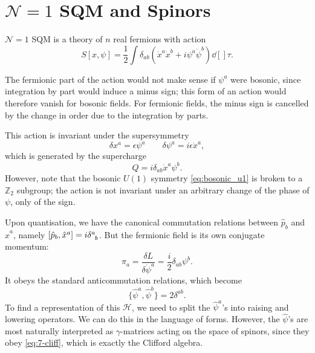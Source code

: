 \section{\texorpdfstring{$\mathcal{N} = 1$}{One-dimensional} SQM and Spinors }%
\label{sec:$n = 1$_one_dimensional_sqm_and_spinors_}

$\mathcal{N} = 1$ SQM is a theory of $n$ real fermions with action
\begin{equation}
  S[x, \psi] = \frac{1}{2} \int \delta_{ab} \left( \dot{x}^{a} \dot{x}^{b} + i \psi^{a} \dot{\psi}^{b} \right) \dd[]{\tau}.
\end{equation}
\begin{remark}
  The fermionic part of the action would not make sense if $\psi^{a}$ were bosonic, since integration by part would induce a minus sign; this form of an action would therefore vanish for bosonic fields.
  For fermionic fields, the minus sign is cancelled by the change in order due to the integration by parts.
\end{remark}
This action is invariant under the supersymmetry
\begin{equation}
  \label{eq:n1susy}
  \delta x^{a} = \epsilon \psi^{a} \qquad \delta\psi^{a} = i \epsilon \dot{x}^{a},
\end{equation}
which is generated by the supercharge
\begin{equation}
  Q = i \delta_{ab} \dot{x}^{a} \psi^{b}.
\end{equation}
However, note that the bosonic $U(1)$ symmetry \eqref{eq:bosonic_u1} is broken to a $\mathbb{Z}_2$ subgroup; the action is not invariant under an arbitrary change of the phase of $\psi$, only of the sign.

Upon quantisation, we have the canonical commutation relations between $\hat{p}_{b}$ and $\hat{x}^{a}$, namely $[\hat{p}_b, \hat{x}^{a}] = i \delta\indices{^{a}_{b}}$. But the fermionic field is its own conjugate momentum:
\begin{equation}
  \pi_a = \frac{\delta L}{\delta \dot{\psi}^{a}} = \frac{i}{2} \delta_{ab} \psi^{b}.
\end{equation} 
It obeys the standard anticommutation relations, which become
\begin{equation}
  \label{eq:7-cliff}
  \{\hat{\psi}^{a}, \hat{\psi}^{b}\} = 2 \delta^{ab}.
\end{equation}
To find a representation of this $\mathscr{H}$, we need to split the $\hat{\psi}^a$'s into raising and lowering operators.
We can do this in the language of forms. However, the $\hat\psi$'s are most naturally interpreted as $\gamma$-matrices acting on the space of spinors, since they obey \eqref{eq:7-cliff}, which is exactly the Clifford algebra.

